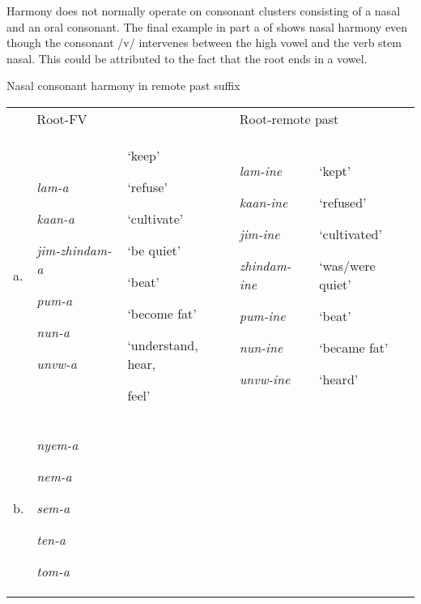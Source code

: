 \documentclass[output=paper]{langsci/langscibook}
\begin{document}
Harmony does not normally operate on consonant clusters consisting of a nasal and an oral consonant. The final example in part a of  shows nasal harmony even though the consonant /v/ intervenes between the high vowel and the verb stem nasal. This could be attributed to the fact that the root ends in a vowel. 


\begin{table}
\caption{Nasal consonant harmony in remote past suffix}
\label{tab:4}
\end{table}

\begin{tabularx}{\textwidth}{XXXXX} & \multicolumn{2}{l}{Root-FV} & \multicolumn{2}{l}{Root-remote past}\\
\lsptoprule
a. & {\emph{lam-a}}

{\emph{kaan-a}}

{\emph{jim-zhindam-a}}

{\emph{pum-a}}

{\emph{nun-a}}

\emph{unvw-a} & {‘keep’}

{‘refuse’}

{‘cultivate’}

{‘be quiet’}

{‘beat’}

{‘become fat’}

{‘understand, hear,}

feel’ & {\emph{lam-ine}}

{\emph{kaan-ine}}

{\emph{jim-ine}}

{\emph{zhindam-ine}}

{\emph{pum-ine}}

{\emph{nun-ine}}

\emph{unvw-ine} & {‘kept’}

{‘refused’}

{‘cultivated’}

{‘was/were quiet’}

{‘beat’}

{‘became fat’}

‘heard’\\
b. & {\emph{nyem-a }}

{\emph{nem-a }}

{\emph{sem-a}}

{\emph{ten-a}}

{\emph{tom-a}}


\end{tabularx}
\end{document}

